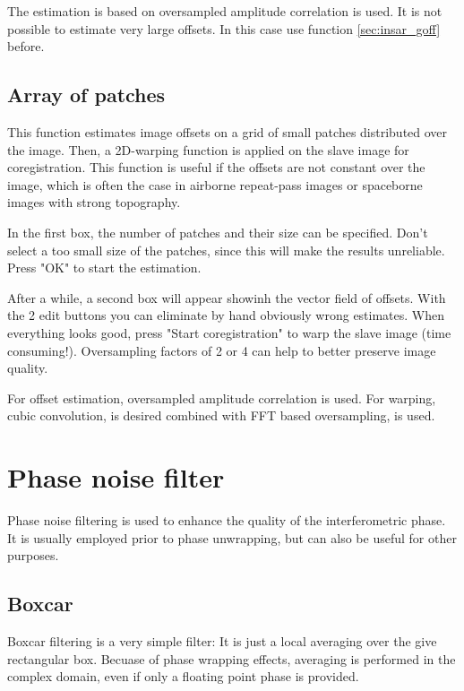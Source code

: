 The estimation is based on oversampled amplitude correlation is used.
It is not possible to estimate very large offsets. In this case use
function \ref{sec:insar_goff} before.
\subsection{Array of patches}\label{sec:insar_soff}
This function estimates image offsets on a grid of small patches
distributed over the image. Then, a 2D-warping function is applied on
the slave image for coregistration. This function is useful if the
offsets are not constant over the image, which is often the case
in airborne repeat-pass images or spaceborne images with strong
topography.

In the first box, the number of patches and their size can be specified.
Don't select a too small size of the patches, since this will make the
results unreliable. Press "OK" to start the estimation.

After a while, a second box will appear showinh the vector field of
offsets. With the 2 edit buttons you can eliminate by hand obviously
wrong estimates. When everything looks good, press "Start coregistration"
to warp the slave image (time consuming!). Oversampling factors of 2 or 4
can help to better preserve image quality.

For offset estimation, oversampled amplitude correlation is used. For
warping, cubic convolution, is desired combined with FFT based 
oversampling, is used.

\section{Phase noise filter}
Phase noise filtering is used to enhance the quality of the interferometric
phase. It is usually employed prior to phase unwrapping, but can also be
useful for other purposes.
\subsection{Boxcar}
Boxcar filtering is a very simple filter: It is just a 
local averaging over the give rectangular box. Becuase of phase
wrapping effects, averaging is performed in the complex domain,
even if only a floating point phase is provided.
